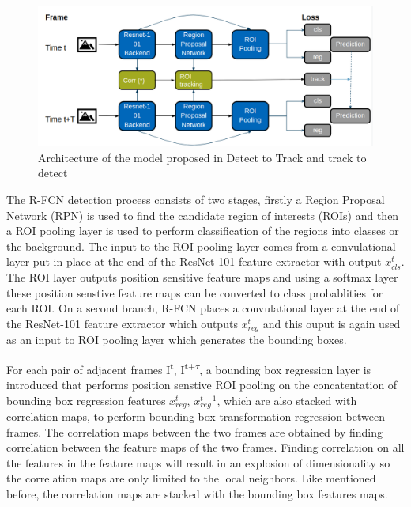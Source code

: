 \documentclass[conference]{IEEEtran}
\begin{document}
\begin{figure}[h]
\includegraphics[width=\columnwidth]{D&T-architecture}
\caption{Architecture of the model proposed in Detect to Track and track to detect}
\end{figure}

The R-FCN\cite{b19} detection process consists of two stages, firstly a Region Proposal Network (RPN)\cite{b38} is used to find the candidate region of interests (ROIs) and then a ROI pooling layer\cite{b39} is used to perform classification of the regions into classes or the background. The input to the ROI pooling layer comes from a convulational layer put in place at the end of the ResNet-101 feature extractor\cite{b40} with output $x^t_{cls}$. The ROI layer outputs position sensitive feature maps and using a softmax layer these position senstive feature maps can be converted to class probablities for each ROI. On a second branch, R-FCN places a convulational layer at the end of the ResNet-101 feature extractor which outputs $x^t_{reg}$ and this ouput is again used as an input to ROI pooling layer which generates the bounding boxes. \newline

For each pair of adjacent frames I\textsuperscript{t}, I\textsuperscript{t+$\tau$}, a bounding box regression layer is introduced that performs position senstive ROI pooling on the concatentation of bounding box regression features $x^t_{reg}$, $x^{t-1}_{reg}$, which are also stacked with correlation maps, to perform bounding box transformation regression between frames. The correlation maps between the two frames are obtained by finding correlation between the feature maps of the two frames. Finding correlation on all the features in the feature maps will result in an explosion of dimensionality so the correlation maps are only limited to the local neighbors. Like mentioned before, the correlation maps are stacked with the bounding box features maps. \newline
\end{document}
